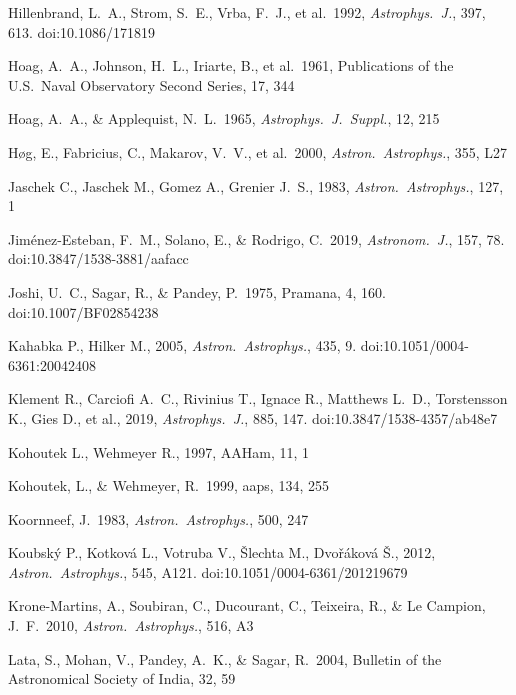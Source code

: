 \documentclass{jaa}
\def\apjs{{\it Astrophys.~J.~Suppl.}}
\def\apj{{\it Astrophys.~J.}}
\def\aj{{\it Astronom.~J.}}
\def\aap{{\it Astron.~Astrophys.}}
\begin{document}
\begin{thebibliography}{99}
 Hillenbrand, L.~A., Strom, S.~E., Vrba, F.~J., et al.\ 1992, \apj, 397, 613. doi:10.1086/171819

 Hoag, A.~A., Johnson, H.~L., Iriarte, B., et al.\ 1961, Publications of the U.S.~Naval Observatory Second Series, 17, 344 

 Hoag, A.~A., \& Applequist, N.~L.\ 1965, \apjs, 12, 215

 H{\o}g, E., Fabricius, C., Makarov, V.~V., et al.\ 2000, \aap, 355, L27

 Jaschek C., Jaschek M., Gomez A., Grenier J.~S., 1983, \aap, 127, 1

 Jim{\'e}nez-Esteban, F.~M., Solano, E., \& Rodrigo, C.\ 2019, \aj, 157, 78. doi:10.3847/1538-3881/aafacc

 Joshi, U.~C., Sagar, R., \& Pandey, P.\ 1975, Pramana, 4, 160. doi:10.1007/BF02854238

 Kahabka P., Hilker M., 2005, \aap, 435, 9. doi:10.1051/0004-6361:20042408

 Klement R., Carciofi A.~C., Rivinius T., Ignace R., Matthews L.~D., Torstensson K., Gies D., et al., 2019, \apj, 885, 147. doi:10.3847/1538-4357/ab48e7

 Kohoutek L., Wehmeyer R., 1997, AAHam, 11, 1

 Kohoutek, L., \& Wehmeyer, R.\ 1999, aaps, 134, 255

 Koornneef, J.\ 1983, \aap, 500, 247

 Koubsk{\'y} P., Kotkov{\'a} L., Votruba V., {\v{S}}lechta M., Dvo{\v{r}}{\'a}kov{\'a} {\v{S}}., 2012, \aap, 545, A121. doi:10.1051/0004-6361/201219679

 Krone-Martins, A., Soubiran, C., Ducourant, C., Teixeira, R., \& Le Campion, J.~F.\ 2010, \aap, 516, A3 

 Lata, S., Mohan, V., Pandey, A.~K., \& Sagar, R.\ 2004, Bulletin of the Astronomical Society of India, 32, 59 


\end{thebibliography}
\end{document}
